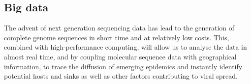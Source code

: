 \subsection{Big data}
The advent of next generation sequencing data has lead to the generation of complete genome sequences in short time and at relatively low costs.
This, combined with high-performance computing, will allow us to analyse the data in almost real time, and by coupling molecular sequence data with geographical information, to trace the diffusion of emerging epidemics and instantly identify potential hosts and sinks as well as other factors contributing to viral spread.   























